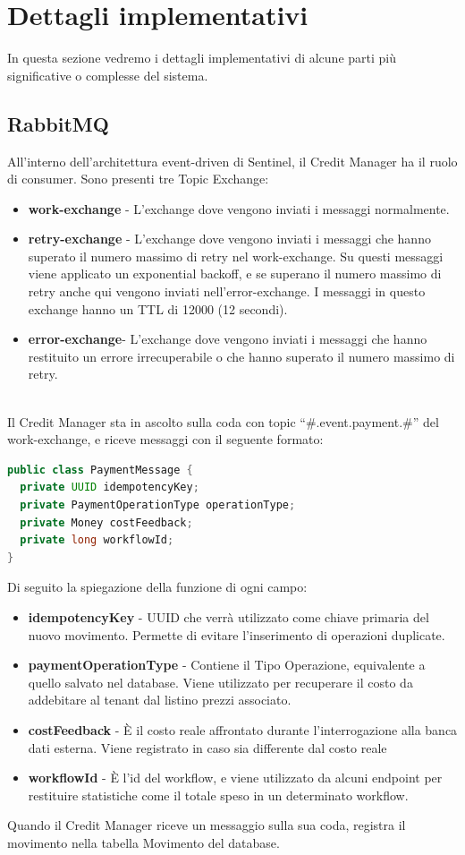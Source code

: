 \chapter{Dettagli implementativi}
In questa sezione vedremo i dettagli implementativi di alcune parti pi\`u significative o complesse del sistema.

\section{RabbitMQ}
All'interno dell'architettura event-driven di Sentinel, il Credit Manager ha il ruolo di consumer.
Sono presenti tre Topic Exchange:
\begin{itemize}
  \item \textbf{work-exchange} - L'exchange dove vengono inviati i messaggi normalmente.
  \item \textbf{retry-exchange} - L'exchange dove vengono inviati i messaggi che hanno superato il numero massimo di retry nel work-exchange.
    Su questi messaggi viene applicato un exponential backoff, e se superano il numero massimo di retry anche qui vengono inviati nell'error-exchange. I messaggi in questo
    exchange hanno un TTL di 12000 (12 secondi).
  \item \textbf{error-exchange}- L'exchange dove vengono inviati i messaggi che hanno restituito un errore irrecuperabile o che hanno superato il numero massimo di retry.
\end{itemize}
\textbf{}\\
Il Credit Manager sta in ascolto sulla coda con topic ``\#.event.payment.\#'' del work-exchange, e riceve messaggi con il seguente formato:

\begin{lstlisting}[language=Java]
public class PaymentMessage {
  private UUID idempotencyKey;
  private PaymentOperationType operationType;
  private Money costFeedback;
  private long workflowId;
}
\end{lstlisting}
Di seguito la spiegazione della funzione di ogni campo:
\begin{itemize}
  \item \textbf{idempotencyKey} - UUID che verr\`a utilizzato come chiave primaria del nuovo movimento. Permette di evitare l'inserimento
    di operazioni duplicate.
  \item \textbf{paymentOperationType} - Contiene il Tipo Operazione, equivalente a quello salvato nel database. Viene utilizzato per recuperare il costo da addebitare
    al tenant dal listino prezzi associato.
  \item \textbf{costFeedback} - \`E il costo reale affrontato durante l'interrogazione alla banca dati esterna. Viene registrato in caso sia differente dal costo reale
  \item \textbf{workflowId} - \`E l'id del workflow, e viene utilizzato da alcuni endpoint per restituire statistiche come il totale speso in un determinato workflow.
\end{itemize}
Quando il Credit Manager riceve un messaggio sulla sua coda, registra il movimento nella tabella Movimento del database.

